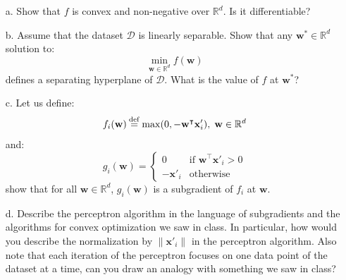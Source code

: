 \documentclass[11pt]{article}
\theoremstyle{remark}
\newcommand{\R}{\mathbb{R}}                     %
\newcommand{\eqdef}{\mathbin{\stackrel{\rm def}{=}}}
\newcommand{\bx}{\mathbf{x}}
\newcommand{\bw}{\mathbf{w}}
\begin{document}
\begin{itemize}
    \item[a.] Show that $f$ is convex and non-negative over $\R^d$. Is it
        differentiable?
    \item[b.] Assume that the dataset $\mathcal{D}$ is linearly separable. Show
        that any $\bw^*\in\R^d$ solution to:
        \begin{displaymath}
            \min_{\bw\in\R^d} f(\bw)
        \end{displaymath}
        defines a separating hyperplane of $\mathcal{D}$. What is the value of
        $f$ at $\bw^*$?
    \item[c.] Let us define:
        \begin{displaymath}
            f_i(\bw) \eqdef \max(0, -\bw^\intercal \bx_i'),\;\bw\in\R^d
        \end{displaymath}
        and:
        \begin{displaymath}
            g_i(\bw) = \begin{cases}
                0& \text{if } \bw^\intercal\bx'_i > 0\\
                -\bx'_i & \text{otherwise}
            \end{cases}
        \end{displaymath}
        show that for all $\bw\in\R^d$, $g_i(\bw)$ is a subgradient of $f_i$ at
        $\bw$.
    \item[d.] Describe the perceptron algorithm in the language of subgradients
        and the algorithms for convex optimization we saw in class. In
        particular, how would you describe the normalization by $\|\bx'_i\|$ in
        the perceptron algorithm. Also note that each iteration of the
        perceptron focuses on one data point of the dataset at a time, can you
        draw an analogy with something we saw in class?
\end{itemize}
\end{document}
